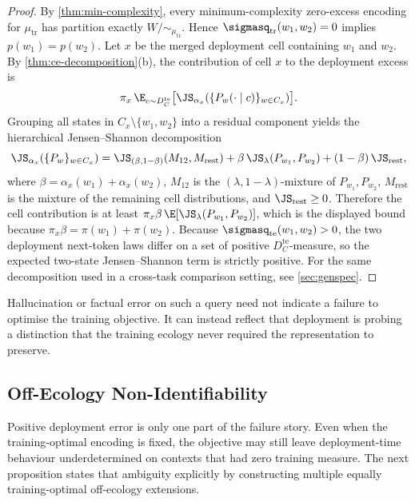 \begin{proof}
By \cref{thm:min-complexity}, every minimum-complexity zero-excess encoding for $\mu_{\mathrm{tr}}$ has partition exactly $W/{\sim_{\mu_{\mathrm{tr}}}}$. Hence $\sigmasq_{\mathrm{tr}}(w_1,w_2)=0$ implies $p(w_1)=p(w_2)$. Let $x$ be the merged deployment cell containing $w_1$ and $w_2$. By \cref{thm:ce-decomposition}(b), the contribution of cell $x$ to the deployment excess is
\[
\pi_x\, \E_{c\sim D_C^{\mathrm{te}}}
\bigl[\JS_{\alpha_x}(\{P_w(\cdot\mid c)\}_{w\in C_x})\bigr].
\]
Grouping all states in $C_x \setminus \{w_1,w_2\}$ into a residual component yields the hierarchical Jensen--Shannon decomposition
\[
\JS_{\alpha_x}(\{P_w\}_{w\in C_x})
= \JS_{(\beta,1-\beta)}(M_{12},M_{\mathrm{rest}})
  + \beta\,\JS_{\lambda}(P_{w_1},P_{w_2})
  + (1-\beta)\,\JS_{\mathrm{rest}},
\]
where $\beta=\alpha_x(w_1)+\alpha_x(w_2)$, $M_{12}$ is the $(\lambda,1-\lambda)$-mixture of $P_{w_1},P_{w_2}$, $M_{\mathrm{rest}}$ is the mixture of the remaining cell distributions, and $\JS_{\mathrm{rest}}\ge 0$. Therefore the cell contribution is at least $\pi_x\beta\,\E[\JS_{\lambda}(P_{w_1},P_{w_2})]$, which is the displayed bound because $\pi_x\beta=\pi(w_1)+\pi(w_2)$. Because $\sigmasq_{\mathrm{te}}(w_1,w_2)>0$, the two deployment next-token laws differ on a set of positive $D_C^{\mathrm{te}}$-measure, so the expected two-state Jensen--Shannon term is strictly positive. For the same decomposition used in a cross-task comparison setting, see \cref{sec:genspec}.
\end{proof}

\begin{interpretation}
Hallucination or factual error on such a query need not indicate a failure to optimise the training objective. It can instead reflect that deployment is probing a distinction that the training ecology never required the representation to preserve.
\end{interpretation}

\subsection{Off-Ecology Non-Identifiability}

Positive deployment error is only one part of the failure story. Even when the training-optimal encoding is fixed, the objective may still leave deployment-time behaviour underdetermined on contexts that had zero training measure. The next proposition states that ambiguity explicitly by constructing multiple equally training-optimal off-ecology extensions.

